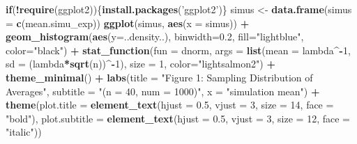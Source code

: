 \documentclass[]{article}
\newenvironment{Shaded}{\begin{snugshade}}{\end{snugshade}}
\newcommand{\KeywordTok}[1]{\textcolor[rgb]{0.13,0.29,0.53}{\textbf{#1}}}
\newcommand{\DataTypeTok}[1]{\textcolor[rgb]{0.13,0.29,0.53}{#1}}
\newcommand{\DecValTok}[1]{\textcolor[rgb]{0.00,0.00,0.81}{#1}}
\newcommand{\FloatTok}[1]{\textcolor[rgb]{0.00,0.00,0.81}{#1}}
\newcommand{\StringTok}[1]{\textcolor[rgb]{0.31,0.60,0.02}{#1}}
\newcommand{\ControlFlowTok}[1]{\textcolor[rgb]{0.13,0.29,0.53}{\textbf{#1}}}
\newcommand{\OperatorTok}[1]{\textcolor[rgb]{0.81,0.36,0.00}{\textbf{#1}}}
\newcommand{\NormalTok}[1]{#1}
\begin{document}
\begin{Shaded}
\begin{Highlighting}[]
\ControlFlowTok{if}\NormalTok{(}\OperatorTok{!}\KeywordTok{require}\NormalTok{(ggplot2))\{}\KeywordTok{install.packages}\NormalTok{(}\StringTok{'ggplot2'}\NormalTok{)\}}
\NormalTok{simus <-}\StringTok{ }\KeywordTok{data.frame}\NormalTok{(}\DataTypeTok{simus =} \KeywordTok{c}\NormalTok{(mean.simu_exp))}
\KeywordTok{ggplot}\NormalTok{(simus, }\KeywordTok{aes}\NormalTok{(}\DataTypeTok{x =}\NormalTok{ simus)) }\OperatorTok{+}
\StringTok{        }\KeywordTok{geom_histogram}\NormalTok{(}\KeywordTok{aes}\NormalTok{(}\DataTypeTok{y=}\NormalTok{..density..), }\DataTypeTok{binwidth=}\FloatTok{0.2}\NormalTok{, }\DataTypeTok{fill=}\StringTok{"lightblue"}\NormalTok{, }\DataTypeTok{color=}\StringTok{"black"}\NormalTok{) }\OperatorTok{+}
\StringTok{        }\KeywordTok{stat_function}\NormalTok{(}\DataTypeTok{fun =}\NormalTok{ dnorm, }
                      \DataTypeTok{args =} \KeywordTok{list}\NormalTok{(}\DataTypeTok{mean =}\NormalTok{ lambda}\OperatorTok{^-}\DecValTok{1}\NormalTok{, }\DataTypeTok{sd =}\NormalTok{ (lambda}\OperatorTok{*}\KeywordTok{sqrt}\NormalTok{(n))}\OperatorTok{^-}\DecValTok{1}\NormalTok{),}
                      \DataTypeTok{size =} \DecValTok{1}\NormalTok{, }
                      \DataTypeTok{color=}\StringTok{"lightsalmon2"}\NormalTok{) }\OperatorTok{+}\StringTok{ }
\StringTok{        }\KeywordTok{theme_minimal}\NormalTok{() }\OperatorTok{+}
\StringTok{        }\KeywordTok{labs}\NormalTok{(}\DataTypeTok{title =} \StringTok{"Figure 1: Sampling Distribution of Averages"}\NormalTok{,}
             \DataTypeTok{subtitle =} \StringTok{"(n = 40, num = 1000)"}\NormalTok{,}
             \DataTypeTok{x =} \StringTok{"simulation mean"}\NormalTok{) }\OperatorTok{+}\StringTok{ }
\StringTok{        }\KeywordTok{theme}\NormalTok{(}\DataTypeTok{plot.title =} \KeywordTok{element_text}\NormalTok{(}\DataTypeTok{hjust =} \FloatTok{0.5}\NormalTok{, }\DataTypeTok{vjust =} \DecValTok{3}\NormalTok{, }\DataTypeTok{size =} \DecValTok{14}\NormalTok{, }\DataTypeTok{face =} \StringTok{"bold"}\NormalTok{),}
              \DataTypeTok{plot.subtitle =} \KeywordTok{element_text}\NormalTok{(}\DataTypeTok{hjust =} \FloatTok{0.5}\NormalTok{, }\DataTypeTok{vjust =} \DecValTok{3}\NormalTok{, }\DataTypeTok{size =} \DecValTok{12}\NormalTok{, }\DataTypeTok{face =} \StringTok{"italic"}\NormalTok{))}
\end{Highlighting}
\end{Shaded}
\end{document}
